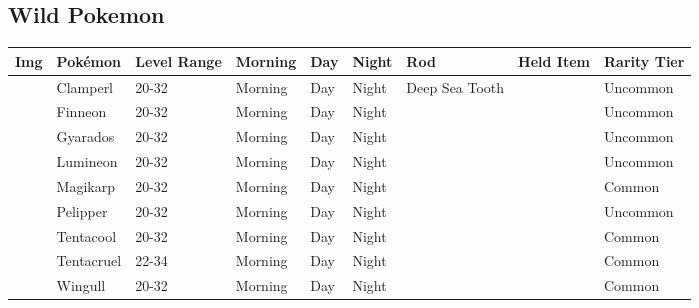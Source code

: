 \subsection{Wild Pokemon}%
\label{subsec:WildPokemon}%
\begin{longtable}{||l l l l l l l l l||}%
\hline%
Img&Pokémon&Level Range&Morning&Day&Night&Rod&Held Item&Rarity Tier\\%
\hline%
\endhead%
\hline%
&Clamperl&20{-}32&Morning&Day&Night&Deep Sea Tooth&&Uncommon\\%
\hline%
&Finneon&20{-}32&Morning&Day&Night&&&Uncommon\\%
\hline%
&Gyarados&20{-}32&Morning&Day&Night&&&Uncommon\\%
\hline%
&Lumineon&20{-}32&Morning&Day&Night&&&Uncommon\\%
\hline%
&Magikarp&20{-}32&Morning&Day&Night&&&Common\\%
\hline%
&Pelipper&20{-}32&Morning&Day&Night&&&Uncommon\\%
\hline%
&Tentacool&20{-}32&Morning&Day&Night&&&Common\\%
\hline%
&Tentacruel&22{-}34&Morning&Day&Night&&&Common\\%
\hline%
&Wingull&20{-}32&Morning&Day&Night&&&Common\\%
\hline%
\end{longtable}